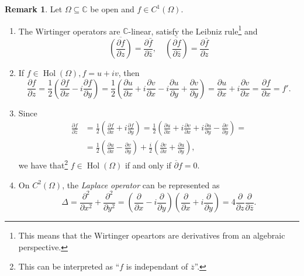 \documentclass[letterpaper, 11pt]{article}
\newcommand{\C}{\mathbb{C}}
\newcommand{\1}{\mathds{1}}
\newcommand{\wirtzbar}{\overline{\partial}}
\DeclareMathOperator*{\Hol}{Hol}
\theoremstyle{definition}
\newtheorem{remark}[theorem]{Remark}
\begin{document}
\begin{remark}
  Let $\Omega \subseteq \C$ be open and $f \in C^1(\Omega)$.
  \begin{enumerate}
    \item The Wirtinger operators are $\C$-linear, satisfy the Leibniz rule\footnote{This means that the Wirtinger opeartors are derivatives from an algebraic perspective.} and
    $$ \overline{\left( \frac{\partial f}{\partial z} \right)} = \frac{\partial \bar{f}}{\partial \bar{z}}, \quad \overline{\left( \frac{\partial f}{\partial \bar{z}} \right)} = \frac{\partial \bar{f}}{\partial z} $$
    \item If $f \in \Hol(\Omega), f = u + iv$, then
    $$
      \frac{\partial f}{\partial z} = \frac{1}{2} \left( \frac{\partial f}{\partial x} - i \frac{\partial f}{\partial y} \right) = \frac{1}{2} \left( \frac{\partial u}{\partial x} + i\frac{\partial v}{\partial x} - i\frac{\partial u}{\partial y} + \frac{\partial v}{\partial y} \right) = \frac{\partial u}{\partial x} + i \frac{\partial v}{\partial x} = \frac{\partial f}{\partial x} = f'.
    $$
    \item Since
    \begin{align*}      
      \frac{\partial f}{\partial \bar{z}} &= \frac{1}{2} \left( \frac{\partial f}{\partial x} + i \frac{\partial f}{\partial y} \right) = \frac{1}{2} \left( \frac{\partial u}{\partial x} + i\frac{\partial v}{\partial x} + i\frac{\partial u}{\partial y} - \frac{\partial v}{\partial y} \right) = \\
      &= \frac{1}{2} \left( \frac{\partial u}{\partial x} - \frac{\partial v}{\partial y} \right) + \frac{i}{2} \left( \frac{\partial v}{\partial x} + \frac{\partial u}{\partial y} \right),
    \end{align*}
    we have that\footnote{This can be interpreted as ``$f$ is independant of $\overline{z}$''.} $f \in \Hol(\Omega)$ if and only if $\wirtzbar f = 0$.
    \item On $C^2(\Omega)$, the \emph{Laplace operator} can be represented as
    $$ \Delta = \frac{\partial^2}{\partial x^2} + \frac{\partial^2}{\partial y^2} = \left( \frac{\partial}{\partial x} - i \frac{\partial}{\partial y} \right) \left( \frac{\partial}{\partial x} + i \frac{\partial}{\partial y} \right) = 4 \frac{\partial}{\partial z} \frac{\partial}{\partial \bar{z}}. $$
  \end{enumerate}
\end{remark}
\end{document}
